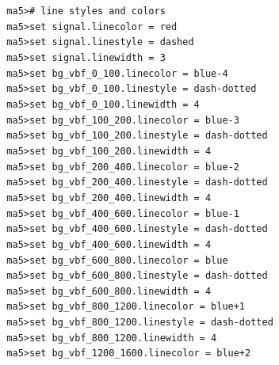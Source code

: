 \documentclass[a4paper, 10pt]{article}
\begin{document}
\texttt{ }\texttt{ }\texttt{ma5>\# line styles and colors\\
}
\texttt{ }\texttt{ }\texttt{ma5>set signal.linecolor = red\\
}
\texttt{ }\texttt{ }\texttt{ma5>set signal.linestyle = dashed\\
}
\texttt{ }\texttt{ }\texttt{ma5>set signal.linewidth = 3\\
}
\texttt{ }\texttt{ }\texttt{ma5>set bg\_vbf\_0\_100.linecolor = blue-4\\
}
\texttt{ }\texttt{ }\texttt{ma5>set bg\_vbf\_0\_100.linestyle = dash-dotted\\
}
\texttt{ }\texttt{ }\texttt{ma5>set bg\_vbf\_0\_100.linewidth = 4\\
}
\texttt{ }\texttt{ }\texttt{ma5>set bg\_vbf\_100\_200.linecolor = blue-3\\
}
\texttt{ }\texttt{ }\texttt{ma5>set bg\_vbf\_100\_200.linestyle = dash-dotted\\
}
\texttt{ }\texttt{ }\texttt{ma5>set bg\_vbf\_100\_200.linewidth = 4\\
}
\texttt{ }\texttt{ }\texttt{ma5>set bg\_vbf\_200\_400.linecolor = blue-2\\
}
\texttt{ }\texttt{ }\texttt{ma5>set bg\_vbf\_200\_400.linestyle = dash-dotted\\
}
\texttt{ }\texttt{ }\texttt{ma5>set bg\_vbf\_200\_400.linewidth = 4\\
}
\texttt{ }\texttt{ }\texttt{ma5>set bg\_vbf\_400\_600.linecolor = blue-1\\
}
\texttt{ }\texttt{ }\texttt{ma5>set bg\_vbf\_400\_600.linestyle = dash-dotted\\
}
\texttt{ }\texttt{ }\texttt{ma5>set bg\_vbf\_400\_600.linewidth = 4\\
}
\texttt{ }\texttt{ }\texttt{ma5>set bg\_vbf\_600\_800.linecolor = blue\\
}
\texttt{ }\texttt{ }\texttt{ma5>set bg\_vbf\_600\_800.linestyle = dash-dotted\\
}
\texttt{ }\texttt{ }\texttt{ma5>set bg\_vbf\_600\_800.linewidth = 4\\
}
\texttt{ }\texttt{ }\texttt{ma5>set bg\_vbf\_800\_1200.linecolor = blue+1\\
}
\texttt{ }\texttt{ }\texttt{ma5>set bg\_vbf\_800\_1200.linestyle = dash-dotted\\
}
\texttt{ }\texttt{ }\texttt{ma5>set bg\_vbf\_800\_1200.linewidth = 4\\
}
\texttt{ }\texttt{ }\texttt{ma5>set bg\_vbf\_1200\_1600.linecolor = blue+2\\
}
\end{document}
